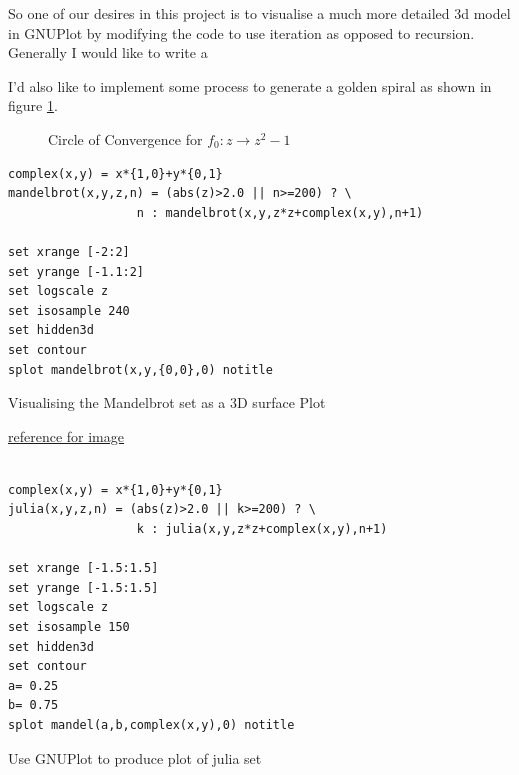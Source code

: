 \documentclass[11pt]{article}
\begin{document}
So one of our desires in this project is to visualise a much more detailed 3d
model in GNUPlot by modifying the code to use iteration as opposed to recursion. Generally I would like to write a


I'd also like to implement some process to generate a golden spiral as shown in figure \ref{golden-spiral}.


\begin{figure}[htbp]
\centering

\caption{\label{golden-spiral}Circle of Convergence for \(f_{0}: z \rightarrow z^{2} - 1\)}
\end{figure}

\begin{listing}[htbp]
\begin{verbatim}
complex(x,y) = x*{1,0}+y*{0,1}
mandelbrot(x,y,z,n) = (abs(z)>2.0 || n>=200) ? \
                  n : mandelbrot(x,y,z*z+complex(x,y),n+1)

set xrange [-2:2]
set yrange [-1.1:2]
set logscale z
set isosample 240
set hidden3d
set contour
splot mandelbrot(x,y,{0,0},0) notitle
\end{verbatim}
\caption{\label{gnuplot-mandelbrot-initial}Visualising the Mandelbrot set as a 3D surface Plot}
\end{listing}

\begin{center}

\end{center}



\href{http://folk.uio.no/inf3330/scripting/doc/gnuplot/Kawano/fractal/mandelbrot-e.html}{reference for image}

\begin{listing}[htbp]
\begin{verbatim}

complex(x,y) = x*{1,0}+y*{0,1}
julia(x,y,z,n) = (abs(z)>2.0 || k>=200) ? \
                  k : julia(x,y,z*z+complex(x,y),n+1)

set xrange [-1.5:1.5]
set yrange [-1.5:1.5]
set logscale z
set isosample 150
set hidden3d
set contour
a= 0.25
b= 0.75
splot mandel(a,b,complex(x,y),0) notitle
\end{verbatim}
\caption{\label{gnuplot-julia}Use GNUPlot to produce plot of  julia set}
\end{listing}

\begin{center}

\end{center}
\end{document}
